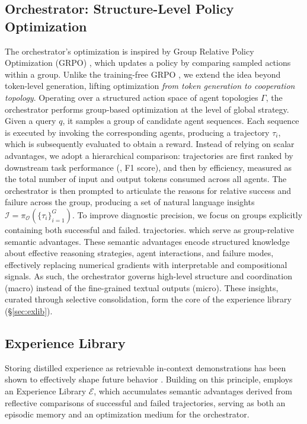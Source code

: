 \subsection{Orchestrator: Structure-Level Policy Optimization}
\label{sec:orchestrator_opt}


The orchestrator's optimization is inspired by Group Relative Policy Optimization (GRPO) \citep{shao2024deepseekmath, cai2025training}, which updates a policy by comparing sampled actions within a group. Unlike the training-free GRPO \citep{cai2025training}, we extend the idea beyond token-level generation, lifting optimization \textit{from token generation to cooperation topology}. Operating over a structured action space of agent topologies $\Gamma$, the orchestrator performs group-based optimization at the level of global strategy. Given a query $q$, it samples a group of candidate agent sequences. Each sequence is executed by invoking the corresponding agents, producing a trajectory $\tau_{i}$, which is subsequently evaluated to obtain a reward. Instead of relying on scalar advantages, we adopt a hierarchical comparison: trajectories are first ranked by downstream task performance (\eg, F1 score), and then by efficiency, measured as the total number of input and output tokens consumed across all agents. The orchestrator is then prompted to articulate the reasons for relative success and failure across the group, producing a set of natural language insights $\mathcal{I} = \pi_{\mathcal{O}}(\{\tau_i\}_{i=1}^G)$. To improve diagnostic precision, we focus on groups explicitly containing both successful and failed.
trajectories. 
 which serve as group-relative semantic advantages. These semantic advantages encode structured knowledge about effective reasoning strategies, agent interactions, and failure modes, effectively replacing numerical gradients with interpretable and compositional signals. As such, the orchestrator governs high-level structure and coordination (macro) instead of the fine-grained textual outputs (micro). These insights, curated through selective consolidation, form the core of the experience library (\S \ref{sec:exlib}).  

\vspace{-13pt}
\subsection{Experience Library}
\vspace{-6pt}
\label{sec:exlib}
Storing distilled experience as retrievable in-context demonstrations has been shown to effectively shape future behavior \citep{zhao2024expel, ouyang2025reasoningbank, xu2025mem}. Building on this principle, \hero employs an Experience Library $\mathcal{E}$, which accumulates semantic advantages derived from reflective comparisons of successful and failed trajectories, serving as both an episodic memory and an optimization medium for the orchestrator.

